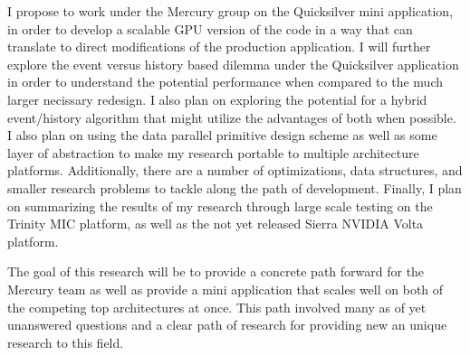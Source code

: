 I propose to work under the Mercury group on the Quicksilver mini application, in order to develop a scalable GPU version of the code in a way that can translate to direct modifications of the production application.
%
I will further explore the event versus history based dilemma under the Quicksilver application in order to understand the potential performance when compared to the much larger necissary redesign.
%
I also plan on exploring the potential for a hybrid event/history algorithm that might utilize the advantages of both when possible.
%
I also plan on using the data parallel primitive design scheme as well as some layer of abstraction to make my research portable to multiple architecture platforms.
%
Additionally, there are a number of optimizations, data structures, and smaller research problems to tackle along the path of development.
%
Finally, I plan on summarizing the results of my research through large scale testing on the Trinity MIC platform, as well as the not yet released Sierra NVIDIA Volta platform.

The goal of this research will be to provide a concrete path forward for the Mercury team as well as provide a mini application that scales well on both of the competing top architectures at once.
%
This path involved many as of yet unanswered questions and a clear path of research for providing new an unique research to this field.




